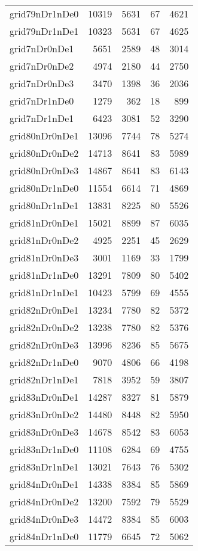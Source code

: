 \begin{longtable}{lrrrr}
grid79nDr1nDe0 & 10319 & 5631 & 67 & 4621 \\
grid79nDr1nDe1 & 10323 & 5631 & 67 & 4625 \\
grid7nDr0nDe1 & 5651 & 2589 & 48 & 3014 \\
grid7nDr0nDe2 & 4974 & 2180 & 44 & 2750 \\
grid7nDr0nDe3 & 3470 & 1398 & 36 & 2036 \\
grid7nDr1nDe0 & 1279 & 362 & 18 & 899 \\
grid7nDr1nDe1 & 6423 & 3081 & 52 & 3290 \\
grid80nDr0nDe1 & 13096 & 7744 & 78 & 5274 \\
grid80nDr0nDe2 & 14713 & 8641 & 83 & 5989 \\
grid80nDr0nDe3 & 14867 & 8641 & 83 & 6143 \\
grid80nDr1nDe0 & 11554 & 6614 & 71 & 4869 \\
grid80nDr1nDe1 & 13831 & 8225 & 80 & 5526 \\
grid81nDr0nDe1 & 15021 & 8899 & 87 & 6035 \\
grid81nDr0nDe2 & 4925 & 2251 & 45 & 2629 \\
grid81nDr0nDe3 & 3001 & 1169 & 33 & 1799 \\
grid81nDr1nDe0 & 13291 & 7809 & 80 & 5402 \\
grid81nDr1nDe1 & 10423 & 5799 & 69 & 4555 \\
grid82nDr0nDe1 & 13234 & 7780 & 82 & 5372 \\
grid82nDr0nDe2 & 13238 & 7780 & 82 & 5376 \\
grid82nDr0nDe3 & 13996 & 8236 & 85 & 5675 \\
grid82nDr1nDe0 & 9070 & 4806 & 66 & 4198 \\
grid82nDr1nDe1 & 7818 & 3952 & 59 & 3807 \\
grid83nDr0nDe1 & 14287 & 8327 & 81 & 5879 \\
grid83nDr0nDe2 & 14480 & 8448 & 82 & 5950 \\
grid83nDr0nDe3 & 14678 & 8542 & 83 & 6053 \\
grid83nDr1nDe0 & 11108 & 6284 & 69 & 4755 \\
grid83nDr1nDe1 & 13021 & 7643 & 76 & 5302 \\
grid84nDr0nDe1 & 14338 & 8384 & 85 & 5869 \\
grid84nDr0nDe2 & 13200 & 7592 & 79 & 5529 \\
grid84nDr0nDe3 & 14472 & 8384 & 85 & 6003 \\
grid84nDr1nDe0 & 11779 & 6645 & 72 & 5062 \\

\end{longtable}
